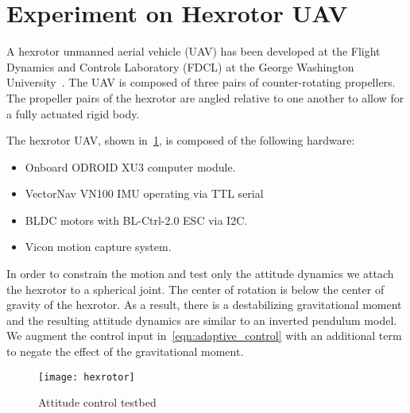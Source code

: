\documentclass[letterpaper, 10 pt, conference]{ieeeconf}  %
\begin{document}
\section{Experiment on Hexrotor UAV}
A hexrotor unmanned aerial vehicle (UAV) has been developed at the Flight Dynamics and Controls Laboratory (FDCL) at the George Washington University~\cite{kaufman2014}.
The UAV is composed of three pairs of counter-rotating propellers. 
The propeller pairs of the hexrotor are angled relative to one another to allow for a fully actuated rigid body.

The hexrotor UAV, shown in~\cref{fig:hexrotor}, is composed of the following hardware:
\begin{itemize}
	\item Onboard ODROID XU3 computer module.
	\item VectorNav VN100 IMU operating via TTL serial %
	\item BLDC motors with BL-Ctrl-2.0 ESC via I2C.
	\item Vicon motion capture system.
\end{itemize}
In order to constrain the motion and test only the attitude dynamics we attach the hexrotor to a spherical joint.
The center of rotation is below the center of gravity of the hexrotor.
As a result, there is a destabilizing gravitational moment and the resulting attitude dynamics are similar to an inverted pendulum model.
We augment the control input in~\cref{eqn:adaptive_control} with an additional term to negate the effect of the gravitational moment.

\begin{figure}
	\centering
	\texttt{[image: hexrotor]}
	\caption{Attitude control testbed~\label{fig:hexrotor}}
\end{figure}
\end{document}
